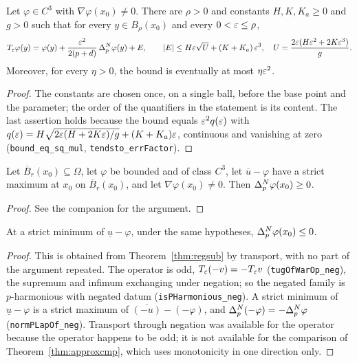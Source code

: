 \begin{theorem}\label{thm:expunif}
\leanok
Let $\varphi \in C^3$ with $\nabla\varphi(x_0) \ne 0$. There are $\rho > 0$ and
constants $H, K, K_a \ge 0$ and $g > 0$ such that for every
$y \in B_\rho(x_0)$ and every $0 < \varepsilon \le \rho$,
\[
  T_\varepsilon\varphi(y) = \varphi(y) + \frac{\varepsilon^2}{2(p+d)}\,\Delta_p^{N}\varphi(y) + E,
  \qquad
  \left\lvert E\right\rvert \le H\varepsilon\sqrt{U} + (K + K_a)\,\varepsilon^3,
  \quad
  U = \frac{2\varepsilon(H\varepsilon^2 + 2K\varepsilon^3)}{g}.
\]
Moreover, for every $\eta > 0$, the bound is eventually at most $\eta\varepsilon^2$.
\end{theorem}

\begin{proof}
\leanok
{}
The constants are chosen once, on a single ball, before the base point and the
parameter; the order of the quantifiers in the statement is its content. The
last assertion holds because the bound equals $\varepsilon^2 q(\varepsilon)$ with
$q(\varepsilon) = H\sqrt{2\varepsilon(H + 2K\varepsilon)/g} + (K + K_a)\varepsilon$, continuous and
vanishing at zero (\texttt{bound\_eq\_sq\_mul}, \texttt{tendsto\_errFactor}).
\end{proof}


\begin{theorem}\label{thm:regsub}
\leanok
{}
Let $\overline{B}_r(x_0) \subseteq \Omega$, let $\varphi$ be bounded and of
class $C^3$, let $\overline{u} - \varphi$ have a strict maximum at $x_0$ on
$\overline{B}_r(x_0)$, and let $\nabla\varphi(x_0) \ne 0$. Then
$\Delta_p^{N}\varphi(x_0) \ge 0$.
\end{theorem}

\begin{proof}
\leanok
{}
See the companion for the argument.
\end{proof}


\begin{theorem}\label{thm:regsup}
\leanok
At a strict minimum of $\underline{u} - \varphi$, under the same hypotheses,
$\Delta_p^{N}\varphi(x_0) \le 0$.
\end{theorem}

\begin{proof}
\leanok
{}
This is obtained from Theorem~\ref{thm:regsub} by transport, with no part of
the argument repeated. The operator is odd,
$T_\varepsilon(-v) = -T_\varepsilon v$ (\texttt{tugOfWarOp\_neg}), the supremum and infimum
exchanging under negation; so the negated family is $p$-harmonious with negated
datum (\texttt{isPHarmonious\_neg}). A strict minimum of
$\underline{u} - \varphi$ is a strict maximum of
$\overline{(-u)} - (-\varphi)$, and $\Delta_p^{N}(-\varphi) = -\Delta_p^{N}\varphi$
(\texttt{normPLapOf\_neg}). Transport through negation was available for the
operator because the operator happens to be odd; it is not available for the
comparison of Theorem~\ref{thm:approxcmp}, which uses monotonicity in one
direction only.
\end{proof}


